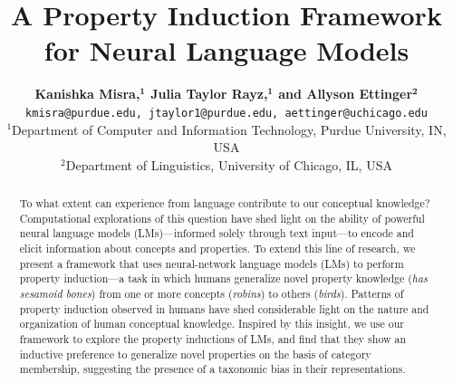 \documentclass[10pt,letterpaper]{article}
\title{A Property Induction Framework for Neural Language Models}
\author{
{\large \bf Kanishka Misra,$^\textbf{1}$ Julia Taylor Rayz,$^\textbf{1}$ and Allyson Ettinger$^\textbf{2}$}\\
\texttt{kmisra@purdue.edu, jtaylor1@purdue.edu, aettinger@uchicago.edu} \\
  $^1$Department of Computer and Information Technology,
  Purdue University, IN, USA \\
  $^2$Department of Linguistics, University of Chicago, IL, USA
}
\newcommand{\ake}[1]{\textcolor{blue}{$_{AE}$[#1]}}
\begin{document}
\maketitle


\begin{abstract}
To what extent can experience from language contribute to our conceptual knowledge? 
Computational explorations of this question have shed light on the ability of powerful neural language models (LMs)---informed solely through text input---to encode and elicit information about concepts and properties. To extend this line of research, we present a framework that uses neural-network language models (LMs) to perform property induction---a task in which humans generalize novel property knowledge (\textit{has sesamoid bones}) from one or more concepts (\textit{robins}) to others (\textit{birds}). Patterns of property induction observed in humans have shed considerable light on the nature and organization of human conceptual knowledge. Inspired by this insight, we use our framework to explore the property inductions of LMs, and find that they show an inductive preference to generalize novel properties on the basis of category membership, suggesting the presence of a taxonomic bias in their representations.


\end{abstract}
\end{document}
